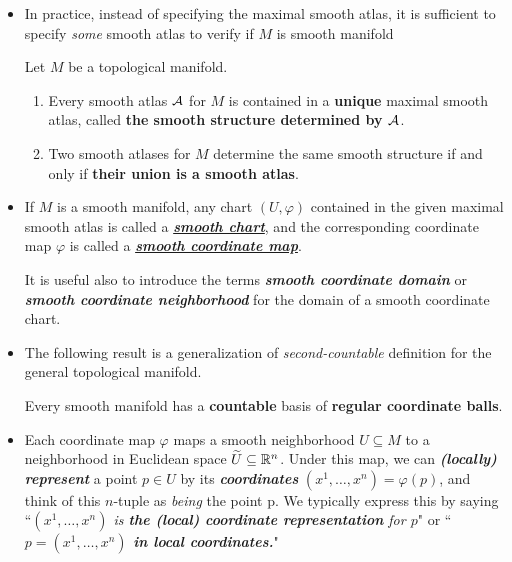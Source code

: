 \documentclass[11pt]{article}
\begin{document}
\begin{itemize}
\item \begin{remark}
In practice, instead of specifying the maximal smooth atlas, it is sufficient to specify \emph{some} smooth atlas to verify if $M$ is smooth manifold
\begin{proposition}
Let $M$ be a topological manifold.
\begin{enumerate}
\item Every smooth atlas ${\mathcal A}$ for $M$ is contained in a \textbf{unique} maximal smooth atlas, called \textbf{the smooth structure determined by ${\mathcal A}$}.
\item Two smooth atlases for $M$ determine the same smooth structure if and only if \textbf{their union is a smooth atlas}.
\end{enumerate}
\end{proposition}
\end{remark}

\item \begin{definition}
If $M$ is a smooth manifold, any chart $(U, \varphi)$ contained in the given maximal smooth atlas is called a \underline{\emph{\textbf{smooth chart}}}, and the corresponding coordinate map $\varphi$ is called a \underline{\emph{\textbf{smooth coordinate map}}}. 

It is useful also to introduce the terms \emph{\textbf{smooth coordinate domain}} or \emph{\textbf{smooth coordinate neighborhood}} for the domain of a smooth coordinate chart.
\end{definition}

\item The following result is a generalization of \emph{second-countable} definition for the general topological manifold.
\begin{proposition}
Every smooth manifold has a \textbf{countable} basis of \textbf{regular coordinate balls}.
\end{proposition}

\item \begin{remark}
Each coordinate map $\varphi$ maps a smooth neighborhood $U \subseteq M$ to a neighborhood in Euclidean space $\widetilde{U} \subseteq {\mathbb R}^{n}$. Under this map, we can \textbf{\emph{(locally)  represent}} a point $p \in U$ by its \emph{\textbf{coordinates}} $(x^1,\ldots, x^n) = \varphi(p)$, and think of this $n$-tuple as \emph{being} the point p. We typically express this by saying ``\emph{$(x^1,\ldots, x^n) $ is \textbf{the (local) coordinate representation} for $p$}" or ``\textbf{\emph{$p = (x^1,\ldots, x^n)$ in local coordinates.}}"
\end{remark}


\end{itemize}
\end{document}
